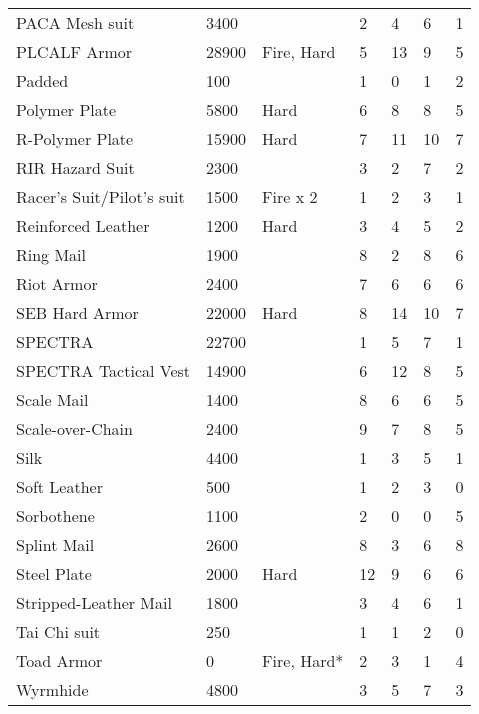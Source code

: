 \documentclass[twoside]{book}
\begin{document}
\begin{longtable}{p{1.25in}llp{2em}p{2em}p{2em}p{2em}}
      \raggedright  PACA Mesh suit& 3400&& 2& 4& 6& 1\tabularnewline
      \raggedright  PLCALF Armor& 28900& Fire, Hard& 5& 13& 9& 5\tabularnewline
      \raggedright  Padded& 100&& 1& 0& 1& 2\tabularnewline
      \raggedright  Polymer Plate& 5800& Hard& 6& 8& 8& 5\tabularnewline
      \raggedright  R-Polymer Plate& 15900& Hard& 7& 11& 10& 7\tabularnewline
      \raggedright  RIR Hazard Suit& 2300&& 3& 2& 7& 2\tabularnewline
      \raggedright  Racer's Suit/Pilot's
           suit& 1500& Fire x 2& 1& 2& 3& 1\tabularnewline
      \raggedright  Reinforced Leather& 1200& Hard& 3& 4& 5& 2\tabularnewline
      \raggedright  Ring Mail& 1900&& 8& 2& 8& 6\tabularnewline
      \raggedright  Riot Armor& 2400&& 7& 6& 6& 6\tabularnewline
      \raggedright  SEB Hard Armor& 22000& Hard& 8& 14& 10& 7\tabularnewline
      \raggedright  SPECTRA& 22700&& 1& 5& 7& 1\tabularnewline
      \raggedright  SPECTRA Tactical Vest& 14900&& 6& 12& 8& 5\tabularnewline
      \raggedright  Scale Mail& 1400&& 8& 6& 6& 5\tabularnewline
      \raggedright  Scale-over-Chain& 2400&& 9& 7& 8& 5\tabularnewline
      \raggedright  Silk& 4400&& 1& 3& 5& 1\tabularnewline
      \raggedright  Soft Leather& 500&& 1& 2& 3& 0\tabularnewline
      \raggedright  Sorbothene& 1100&& 2& 0& 0& 5\tabularnewline
      \raggedright  Splint Mail& 2600&& 8& 3& 6& 8\tabularnewline
      \raggedright  Steel Plate& 2000& Hard& 12& 9& 6& 6\tabularnewline
      \raggedright  Stripped-Leather Mail& 1800&& 3& 4& 6& 1\tabularnewline
      \raggedright  Tai Chi suit& 250&& 1& 1& 2& 0\tabularnewline
      \raggedright  Toad Armor& 0& Fire, Hard*& 2& 3& 1& 4\tabularnewline
      \raggedright  Wyrmhide& 4800&& 3& 5& 7& 3\tabularnewline
      
\end{longtable}
    
\end{document}
